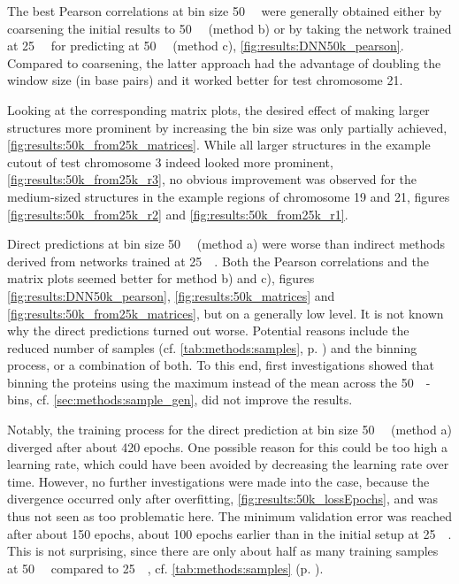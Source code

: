 The best Pearson correlations at bin size \SI{50}{\kilo\bp} were generally obtained either by coarsening the initial results to \SI{50}{\kilo\bp} 
(method b) or by taking the network trained at \SI{25}{\kilo\bp} for predicting at \SI{50}{\kilo\bp} (method c), \cref{fig:results:DNN50k_pearson}.
Compared to coarsening, the latter approach had the advantage of doubling the window size (in base pairs) and it worked better for test chromosome 21.

Looking at the corresponding matrix plots, the desired effect of making larger structures more prominent by increasing the bin size was only partially achieved, \cref{fig:results:50k_from25k_matrices}.
While all larger structures in the example cutout of test chromosome 3 indeed looked more prominent, \cref{fig:results:50k_from25k_r3},
no obvious improvement was observed for the medium-sized structures in the example regions of chromosome 19 and 21, 
figures \ref{fig:results:50k_from25k_r2} and \ref{fig:results:50k_from25k_r1}.

Direct predictions at bin size \SI{50}{\kilo\bp} (method a) were worse than indirect methods derived from networks
trained at \SI{25}{\kilo\bp}. 
Both the Pearson correlations and the matrix plots seemed better for method b) and c),
figures \ref{fig:results:DNN50k_pearson}, \ref{fig:results:50k_matrices} and \ref{fig:results:50k_from25k_matrices}, but on a generally low level.
It is not known why the direct predictions turned out worse. 
Potential reasons include the reduced number of samples (cf. \cref{tab:methods:samples}, p. \pageref{tab:methods:samples})
and the binning process, or a combination of both.
To this end, first investigations showed that binning the proteins using the maximum instead of the mean across the \SI{50}{\kilo\bp}-bins, cf. \cref{sec:methods:sample_gen},
did not improve the results.

Notably, the training process for the direct prediction at bin size \SI{50}{\kilo\bp} (method a) diverged after about 420 epochs.
One possible reason for this could be too high a learning rate, which could have been avoided by decreasing the learning rate over time.
However, no further investigations were made into the case, because the divergence occurred only after overfitting, \cref{fig:results:50k_lossEpochs}, and was thus not seen as too problematic here.
The minimum validation error was reached after about 150 epochs, about 100 epochs earlier than in the initial setup at \SI{25}{\kilo\bp}. 
This is not surprising, since there are only about half as many training samples at \SI{50}{\kilo\bp} compared to \SI{25}{\kilo\bp}, 
cf. \cref{tab:methods:samples} (p. \pageref{tab:methods:samples}).

